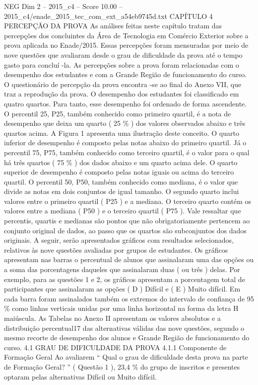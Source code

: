 \begin{textsample}{NEG Dim 2 – 2015\_c4 – Score 10.00 – 2015\_c4/enade\_2015\_tec\_com\_ext\_a54eb9745d.txt}  \label{ex:f2_neg_346}
CAPÍTULO 4 PERCEPÇÃO DA PROVA As análises feitas neste capítulo tratam das percepções dos concluintes da Área de Tecnologia em Comércio Exterior sobre a prova aplicada no Enade/2015.
Essas percepções foram mensuradas por meio de nove questões que avaliaram desde o grau de dificuldade da prova até o tempo gasto para concluí -la.
As percepções sobre a prova foram relacionadas com o desempenho dos estudantes e com a Grande Região de funcionamento do curso.
O questionário de percepção da prova encontra -se ao final do Anexo VII, que traz a reprodução da prova.
O desempenho dos estudantes foi classificado em quatro quartos.
Para tanto, esse desempenho foi ordenado de forma ascendente.
O percentil 25, P25, também conhecido como primeiro quartil, é a nota de desempenho que deixa um quarto ( 25 \% ) dos valores observados abaixo e três quartos acima.
A Figura 1 apresenta uma ilustração deste conceito.
O quarto inferior de desempenho é composto pelas notas abaixo do primeiro quartil.
Já o percentil 75, P75, também conhecido como terceiro quartil, é o valor para o qual há três quartos ( 75 \% ) dos dados abaixo e um quarto acima dele.
O quarto superior de desempenho é composto pelas notas iguais ou acima do terceiro quartil.
O percentil 50, P50, também conhecido como mediana, é o valor que divide as notas em dois conjuntos de igual tamanho.
O segundo quarto inclui valores entre o primeiro quartil ( P25 ) e a mediana.
O terceiro quarto contém os valores entre a mediana ( P50 ) e o terceiro quartil ( P75 ).
Vale ressaltar que percentis, quartis e medianas são pontos que não obrigatoriamente pertencem ao conjunto original de dados, ao passo que os quartos são subconjuntos dos dados originais.
A seguir, serão apresentados gráficos com resultados selecionados, relativos às nove questões avaliadas por grupos de estudantes.
Os gráficos apresentam nas barras o percentual de alunos que assinalaram uma das opções ou a soma das porcentagens daqueles que assinalaram duas ( ou três ) delas.
Por exemplo, para as questões 1 e 2, os gráficos apresentam a porcentagem total de participantes que assinalaram as opções ( D ) Difícil e ( E ) Muito difícil.
Em cada barra foram assinalados também os extremos do intervalo de confiança de 95 \% como linhas verticais unidas por uma linha horizontal na forma da letra H maiúscula.
As Tabelas no Anexo II apresentam os valores absolutos e a distribuição percentual17 das alternativas válidas das nove questões, segundo o mesmo recorte de desempenho dos alunos e Grande Região de funcionamento do curso. 4.1 GRAU DE DIFICULDADE DA PROVA 4.1.1 Componente de Formação Geral Ao avaliarem “ Qual o grau de dificuldade desta prova na parte de Formação Geral? ” ( Questão 1 ), 23,4 \% do grupo de inscritos e presentes optaram pelas alternativas Difícil ou Muito difícil.

\end{textsample}
